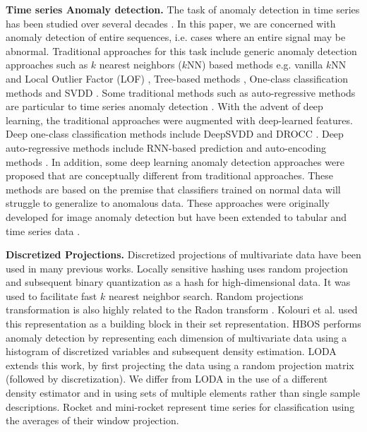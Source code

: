 \documentclass{article}
\begin{document}
\textbf{Time series Anomaly detection.} The task of anomaly detection in time series has been studied over several decades \citep{blazquez2021review}. In this paper, we are concerned with anomaly detection of entire sequences, i.e. cases where an entire signal may be abnormal. Traditional approaches for this task include generic anomaly detection approaches such as $k$ nearest neighbors ($k$NN) based methods e.g. vanilla $k$NN \citep{eskin2002geometric} and Local Outlier Factor (LOF) \citep{breunig2000lof}, Tree-based methods \citep{liu2008isolation}, One-class classification methods \citep{tax2004support} and SVDD \citep{scholkopf1999support}. Some traditional methods such as auto-regressive methods are particular to time series anomaly detection \citep{rousseeuw2005robust}. With the advent of deep learning, the traditional approaches were augmented with deep-learned features. Deep one-class classification methods include DeepSVDD \citep{ruff2018deep} and DROCC \citep{goyal2020drocc}. Deep auto-regressive methods include RNN-based prediction and auto-encoding methods \citep{bontemps2016collective, malhotra2016lstm}. In addition, some deep learning anomaly detection approaches were proposed that are conceptually different from traditional approaches. These methods are based on the premise that classifiers trained on normal data will struggle to generalize to anomalous data. These approaches were originally developed for image anomaly detection \citep{golan2018deep} but have been extended to tabular and time series data \citep{bergman2020classification, qiu2021neural}. 



\textbf{Discretized Projections.} Discretized projections of multivariate data have been used in many previous works. Locally sensitive hashing \cite{dasgupta2011fast} uses random projection and subsequent binary quantization as a hash for high-dimensional data. It was used to facilitate fast $k$ nearest neighbor search. Random projections transformation is also highly related to the Radon transform \cite{radon20051}. Kolouri et al. \citep{kolouri2015radon} used this representation as a building block in their set representation. HBOS \cite{goldstein2012histogram} performs anomaly detection by representing each dimension of multivariate data using a histogram of discretized variables and subsequent density estimation. LODA \cite{pevny2016loda} extends this work, by first projecting the data using a random projection matrix (followed by discretization). We differ from LODA in the use of a different density estimator and in using sets of multiple elements rather than single sample descriptions. Rocket and mini-rocket \cite{dempster2020rocket, dempster2021minirocket} represent time series for classification using the averages of their window projection. 
\end{document}
